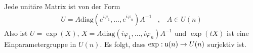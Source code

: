 \begin{beispiel}
    Jede unitäre Matrix ist von der Form
    \begin{align*}
        U = A \text{diag} (e^{i \varphi_1},\dots,e^{i \varphi_n}) A^{-1}
        \hspace{10pt} , \hspace{10pt} A \in U(n)
    \end{align*}
    Also ist $U = \exp(X)$, $X = A \text{diag}(i \varphi_1,\dots,i \varphi_n) A^{-1}$
    und $\exp(t X)$ ist eine Einparametergruppe in $U(n)$. Es folgt, dass
    $\exp: \mathfrak{u}(n) \rightarrow U(n)$ surjektiv ist.
\end{beispiel}
